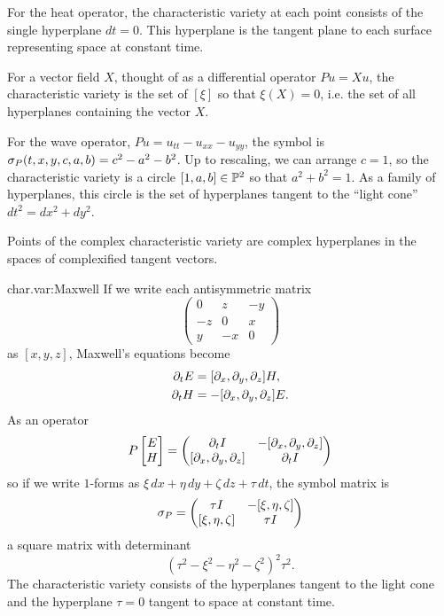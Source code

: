 \begin{example}
For the heat operator, the characteristic variety at each point consists of the single hyperplane \(dt=0\).
This hyperplane is the tangent plane to each surface representing space at constant time.
\end{example}
\begin{example}
For a vector field \(X\), thought of as a differential operator \(Pu=Xu\), the characteristic variety is the set of \([\xi]\) so that \(\xi(X)=0\), i.e. the set of all hyperplanes containing the vector \(X\).
\end{example}
\begin{example}
For the wave operator, \(Pu=u_{tt}-u_{xx}-u_{yy}\), the symbol is \(\opsymbol[P]{t,x,y,c,a,b}=c^2-a^2-b^2\).
Up to rescaling, we can arrange \(c=1\), so the characteristic variety is a circle \([1,a,b] \in \Proj^2\) so that \(a^2+b^2=1\).
As a family of hyperplanes, this circle is the set of hyperplanes tangent to the ``light cone'' \(dt^2=dx^2+dy^2\).
\end{example}
Points of the complex characteristic variety are complex hyperplanes in the spaces of complexified tangent vectors.
\begin{answer}{char.var:Maxwell}
If we write each antisymmetric matrix
\[
\begin{pmatrix}
0 & z & -y \\
-z & 0 & x \\
y & -x & 0
\end{pmatrix}
\]
as \([x,y,z]\), Maxwell's equations become
\begin{align*}
\partial_{t}E&=[\partial_{x},\partial_{y},\partial_{z}]H,\\
\partial_{t}H&=-[\partial_{x},\partial_{y},\partial_{z}]E.
\end{align*}
As an operator
\[
P\begin{bmatrix}E\\H\end{bmatrix}
=
\begin{pmatrix}
\p{t}I & -[\p{x},\p{y},\p{z}]\\
[\p{x},\p{y},\p{z}] & \p{t}I
\end{pmatrix}
\]
so if we write \(1\)-forms as \(\xi\,dx+\eta\,dy+\zeta\,dz+\tau\,dt\),
the symbol matrix is
\[
\opsymbol{P}
=
\begin{pmatrix}
\tau I & -[\xi,\eta,\zeta]\\
[\xi,\eta,\zeta] & \tau I
\end{pmatrix}
\]
a square matrix with determinant
\[
\left(\tau^2 - \xi^2 - \eta^2 - \zeta^2\right)^2 \tau^2.
\]
The characteristic variety consists of the hyperplanes tangent to the light cone and the hyperplane \(\tau=0\) tangent to space at constant time.
\end{answer}

